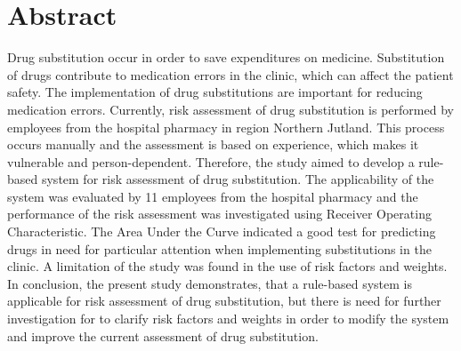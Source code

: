 \chapter*{Abstract}
Drug substitution occur in order to save expenditures on medicine. Substitution of drugs contribute to medication errors in the clinic, which can affect the patient safety. The implementation of drug substitutions are important for reducing medication errors. Currently, risk assessment of drug substitution is performed by employees from the hospital pharmacy in region Northern Jutland. This process occurs manually and the assessment is based on experience, which makes it vulnerable and person-dependent. Therefore, the study aimed to develop a rule-based system for risk assessment of drug substitution. The applicability of the system was evaluated by 11 employees from the hospital pharmacy and the performance of the risk assessment was investigated using Receiver Operating Characteristic. The Area Under the Curve indicated a good test for predicting drugs in need for particular attention when implementing substitutions in the clinic. A limitation of the study was found in the use of risk factors and weights. In conclusion, the present study demonstrates, that a rule-based system is applicable for risk assessment of drug substitution, but  there is need for further investigation for to clarify risk factors and weights in order to modify the system and improve the current assessment of drug substitution.  
